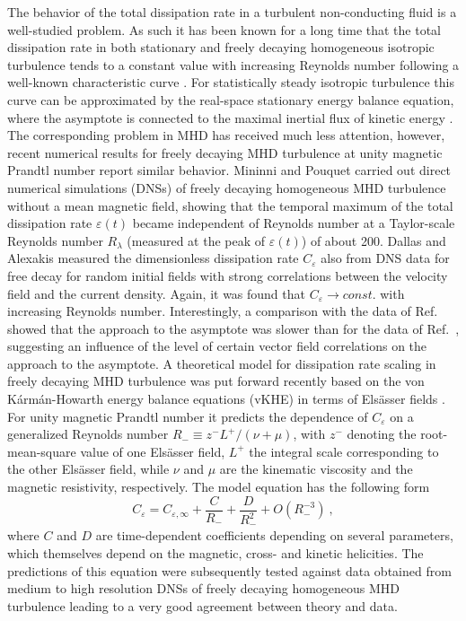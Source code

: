 \documentclass[aps,pre,onecolumn,superscriptaddress,notitlepage]{revtex4-1}
\newcommand{\Ceps}{C_\varepsilon}
\newcommand{\Cinf}{C_{\varepsilon,\infty}}
\newcommand{\Rl}{R_{\lambda}}
\newcommand{\vep}{\varepsilon}
\newcommand{\blue}[1]{{#1}}
\newcommand{\beq}{\begin{equation}}
\newcommand{\eeq}{\end{equation}}
\begin{document}
The behavior of the total dissipation rate in a turbulent non-conducting fluid is 
a well-studied problem. As such it has been known for a long time that
the total dissipation rate in both stationary and freely decaying homogeneous
isotropic turbulence tends to a constant value with increasing Reynolds number following
a well-known characteristic curve 
\cite{Sreenivasan84,Sreenivasan98,McComb14a,McComb15a,Yeung15,Donzis16}.
%
\blue{ For statistically steady isotropic turbulence this curve can be
approximated by the real-space stationary energy balance equation, where the
asymptote is connected to the maximal inertial flux of kinetic energy
\cite{McComb15a}.  }
%
The corresponding problem in MHD has received much less attention, however,
recent numerical results for freely decaying MHD turbulence \blue{at unity
magnetic Prandtl number} report similar behavior.  Mininni and Pouquet
\cite{Mininni09} carried out direct numerical simulations (DNSs) of freely
decaying homogeneous MHD turbulence without a mean magnetic field, showing that
the temporal maximum of the total dissipation rate $\vep(t)$ became independent
of Reynolds number at a Taylor-scale Reynolds number $\Rl$ (measured at the
peak of $\vep(t)$) of about 200.  Dallas and Alexakis \cite{Dallas14b} measured
the dimensionless dissipation rate $\Ceps$ also from DNS data for free decay
for random initial fields with strong correlations between the velocity field
and the current density. Again, it was found that $\Ceps \to const.$ with
increasing Reynolds number.  Interestingly, a comparison with the data of
Ref.~\cite{Mininni09} showed that the approach to the asymptote was slower than
for the data of Ref.~\cite{Mininni09}, suggesting an influence of the level of
certain vector field correlations on the approach to the asymptote.  A
theoretical model for dissipation rate scaling in freely decaying MHD
turbulence was put forward recently \cite{Linkmann15a} based on the von
K\'arm\'an-Howarth energy balance equations (vKHE) in terms of Els\"{a}sser
fields \cite{Politano98}. \blue{For unity magnetic Prandtl number it} predicts
the dependence of $\Ceps$ on a generalized Reynolds number \blue{$R_- \equiv
z^-L^+/(\nu + \mu)$, with $z^-$ denoting the root-mean-square value of one
Els\"asser field, $L^+$ the integral scale corresponding to the other
Els\"asser field, while $\nu$ and $\mu$ are the kinematic viscosity and the
magnetic resistivity, respectively.   The model equation has the following
form}
\beq
\label{eq:approx}
\Ceps = \Cinf + \frac{C}{R_-} + \frac{D}{R_-^2} + O(R_-^{-3}) \ ,
\eeq
where $C$ and $D$ are time-dependent coefficients depending on several parameters, 
which themselves depend on the magnetic, cross- and kinetic helicities.
The predictions
of this equation were subsequently tested against data obtained from medium to high
resolution DNSs of freely decaying homogeneous MHD turbulence leading to a very good agreement between
theory and data. 
\end{document}
